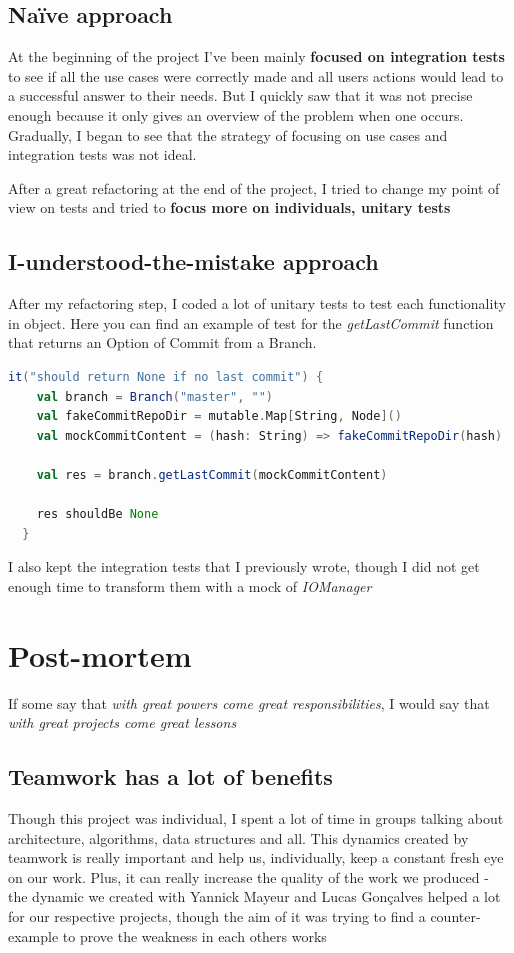 \documentclass[11pt]{article}
\begin{document}
\subsection{Naïve approach}
At the beginning of the project I've been mainly \textbf{focused on integration tests} to see if all the use cases were correctly made and all users actions would lead to a successful answer to their needs. But I quickly saw that it was not precise enough because it only gives an overview of the problem when one occurs. Gradually, I began to see that the strategy of focusing on use cases and integration tests was not ideal.

After a great refactoring at the end of the project, I tried to change my point of view on tests and tried to \textbf{focus more on individuals, unitary tests}

\subsection{I-understood-the-mistake approach}

After my refactoring step, I coded a lot of unitary tests to test each functionality in object.
Here you can find an example of test for the \textit{getLastCommit} function that returns an Option of Commit from a Branch.

\begin{lstlisting}[language=scala, caption=Unitary test of \textit{getLastCommit}]
  it("should return None if no last commit") {
    val branch = Branch("master", "")
    val fakeCommitRepoDir = mutable.Map[String, Node]()
    val mockCommitContent = (hash: String) => fakeCommitRepoDir(hash)

    val res = branch.getLastCommit(mockCommitContent)

    res shouldBe None
  }
\end{lstlisting}

I also kept the integration tests that I previously wrote, though I did not get enough time to transform them with a mock of \textit{IOManager}

\section{Post-mortem}
If some say that \textit{with great powers come great responsibilities}, I would say that \textit{with great projects come great lessons}

\subsection{Teamwork has a lot of benefits}
Though this project was individual, I spent a lot of time in groups talking about architecture, algorithms, data structures and all. This dynamics created by teamwork is really important and help us, individually, keep a constant fresh eye on our work. Plus, it can really increase the quality of the work we produced - the dynamic we created with Yannick Mayeur and Lucas Gonçalves helped a lot for our respective projects, though the aim of it was trying to find a counter-example to prove the weakness in each others works
\end{document}
